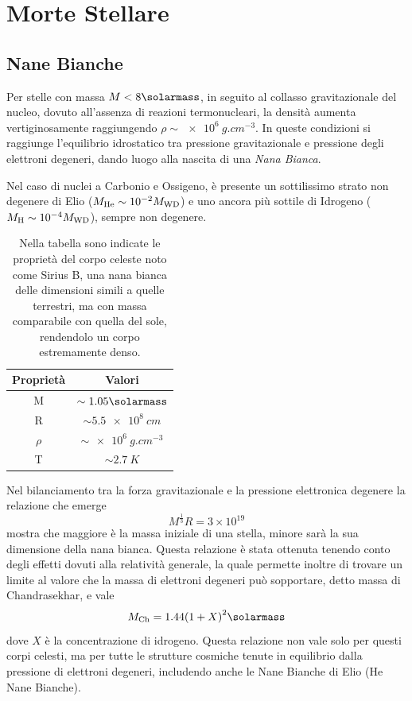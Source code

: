 \section{Morte Stellare}\label{sec:morte-stellare}
\subsection{Nane Bianche}\label{sec:nane-bianche}
Per stelle con massa $M < 8\si{\solarmass}$, in seguito al collasso gravitazionale del nucleo, dovuto all'assenza di reazioni termonucleari, la densità aumenta vertiginosamente raggiungendo $\rho \sim \SI{e6}{g.cm^{-3}}$. In queste condizioni si raggiunge l'equilibrio idrostatico tra pressione gravitazionale e pressione degli elettroni degeneri, dando luogo alla nascita di una \emph{Nana Bianca}.

Nel caso di nuclei a Carbonio e Ossigeno, è presente un sottilissimo strato non degenere di Elio ($M_\textup{He} \sim 10^{-2} M_\textup{WD}$) e uno ancora più sottile di Idrogeno ($M_\textup{H} \sim 10^{-4} M_\textup{WD}$), sempre non degenere. 

\begin{table}
    \centering
    \caption{Nella tabella sono indicate le proprietà del corpo celeste noto come Sirius B, una nana bianca delle dimensioni simili a quelle terrestri, ma con massa comparabile con quella del sole, rendendolo un corpo estremamente denso.}\label{tab:sirius-b}
    \begin{tabular}{c|c}
        \toprule
        Proprietà & Valori\\
        \midrule
        M & $\sim 1.05 \si{\solarmass}$\\
        R & $\sim \SI{5.5 e8}{cm}$\\
        $\rho$ & $\sim \SI{e6}{g.cm^{-3}}$\\
        T & $\sim \SI{2.7}{K}$\\
        \bottomrule
    \end{tabular}
\end{table}

Nel bilanciamento tra la forza gravitazionale e la pressione elettronica degenere la relazione che emerge
\[
    M^{\frac{1}{3}}R = 3\times 10^{19}
\]
mostra che maggiore è la massa iniziale di una stella, minore sarà la sua dimensione della nana bianca. Questa relazione è stata ottenuta tenendo conto degli effetti dovuti alla relatività generale, la quale permette inoltre di trovare un limite al valore che la massa di elettroni degeneri può sopportare, detto massa di Chandrasekhar, e vale
\[
    M_\textup{Ch} = 1.44{(1+X)}^2 \si{\solarmass}
\]
dove $X$ è la concentrazione di idrogeno.
Questa relazione non vale solo per questi corpi celesti, ma per tutte le strutture cosmiche tenute in equilibrio dalla pressione di elettroni degeneri, includendo anche le Nane Bianche di Elio (He Nane Bianche).

